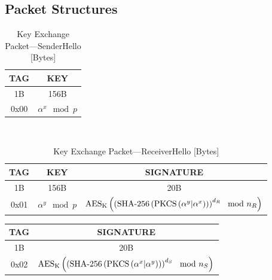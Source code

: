 \documentclass[a4paper]{article}
\begin{document}
\newpage

\begin{appendices}

\section{Packet Structures}

\begin{table}[h!]
    \begin{center}
        \begin{tabular}{| c | c |}
            \hline
            TAG & KEY \\ \hline\hline
            1B & 156B \\ \hline
            0x00 & $\alpha^x\mod{p}$ \\
            \hline
        \end{tabular}
    \end{center}
    \
    \caption{Key Exchange Packet---SenderHello [Bytes]}
    \label{tab:key_exchange_packet_senderhello}
\end{table}
\begin{table}[h!]
    \begin{center}
        \begin{tabular}{| c | c | c |}
            \hline
            TAG & KEY & SIGNATURE \\ \hline\hline
            1B & 156B & 20B \\ \hline
            0x01 & $\alpha^y\mod{p}$ & $\text{AES}_\text{K}\left(\left(\text{SHA-256}\left(\text{PKCS}\left(\alpha^y\small|\alpha^x\right)\right)\right)^{d_R}\mod{n_R}\right)$\\
            \hline
        \end{tabular}
    \end{center}
    
    \caption{Key Exchange Packet---ReceiverHello [Bytes]}
    \label{tab:key_exchange_packet_receiverhello}
\end{table}
\begin{table}[h!]
    \begin{center}
        \begin{tabular}{| c | c |}
            \hline
            TAG & SIGNATURE \\ \hline\hline
            1B & 20B \\ \hline
            0x02 & $\text{AES}_\text{K}\left(\left(\text{SHA-256}\left(\text{PKCS}\left(\alpha^x \small|\alpha^y\right)\right)\right)^{d_S}\mod{n_S}\right)$\\
            \hline
        \end{tabular}
    \end{center}


\end{table}
\end{appendices}
\end{document}
